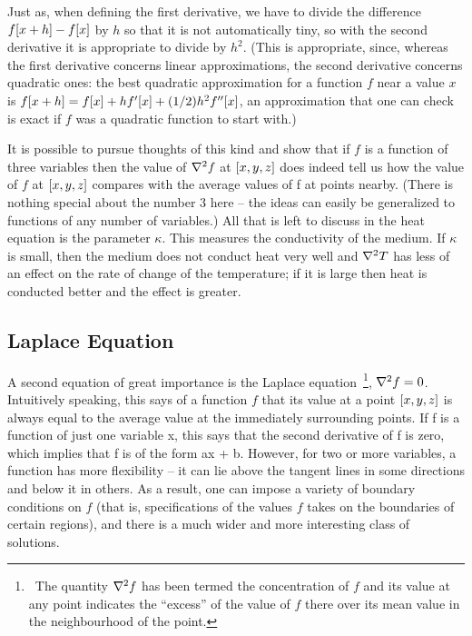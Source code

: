 Just as, when defining the first derivative, we have to divide the difference $f\!\left[{x+h}\right] - f\!\left[{x}\right]$ by $h$ so that it is not automatically tiny, so with the second derivative it is appropriate to divide by $h^2$. (This is appropriate, since, whereas the first derivative concerns linear approximations, the second derivative concerns quadratic ones: the best quadratic approximation for a function $f$ near a value $x$ is $f\!\left[{x+h}\right] = f\!\left[{x}\right] + hf'\!\left[{x}\right] + (1/2)h^2f''\!\left[{x}\right]$, an approximation that one can check is exact if $f$ was a quadratic function to start with.)

It is possible to pursue thoughts of this kind and show that if $f$ is a function of three variables then the value of $\nabla^2 f$ at $\left[{x,y,z}\right]$ does indeed tell us how the value of $f$ at $\left[{x,y,z}\right]$ compares with the average values of f at points nearby. (There is nothing special about the number 3 here -- the ideas can easily be generalized to functions of any number of variables.) All that is left to discuss in the heat equation is the parameter $\kappa$. This measures the conductivity of the medium. If $\kappa$ is small, then the medium does not conduct heat very well and $\nabla^2 T$ has less of an effect on the rate of change of the temperature; if it is large then heat is conducted better and the effect is greater.


\subsection{Laplace Equation}
A second equation of great importance is the Laplace equation~\footnote{~The quantity $\nabla^2 f$ has been termed the concentration of $f$ and its value at any point indicates the ``excess'' of the value of $f$ there over its mean value in the neighbourhood of the point.}, $\nabla^2 f = 0$. Intuitively speaking, this says of a function $f$ that its value at a point $\left[{x,y,z}\right]$ is always equal to the average value at the immediately surrounding points. If f is a function of just one variable x, this says that the second derivative of f is zero, which implies that f is of the form ax + b. However, for two or more variables, a function has more flexibility -- it can lie above the tangent lines in some directions and below it in others. As a result, one can impose a variety of boundary conditions on $f$ (that is, specifications of the values $f$ takes on the boundaries of certain regions), and there is a much wider and more interesting class of solutions.


